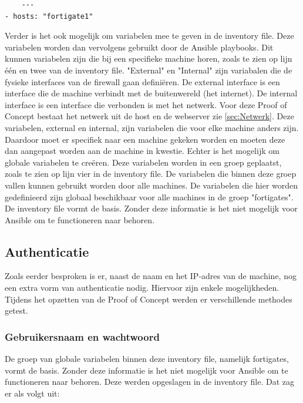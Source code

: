 \begin{lstlisting}
    ---
- hosts: "fortigate1"

\end{lstlisting}
Verder is het ook mogelijk om variabelen mee te geven in de inventory file. Deze variabelen worden dan vervolgens gebruikt door de Ansible playbooks. Dit kunnen variabelen zijn die bij een specifieke machine horen, zoals te zien op lijn één en twee van de inventory file. "External" en "Internal" zijn variabalen die de fysieke interfaces van de firewall gaan definiëren. De external interface is een interface die de machine verbindt met de buitenwereld (het internet). De internal interface is een interface die verbonden is met het netwerk. Voor deze Proof of Concept bestaat het netwerk uit de host en de webserver zie \ref{sec:Netwerk}. Deze variabelen, external en internal, zijn variabelen die voor elke machine anders zijn. Daardoor moet er specifiek naar een machine gekeken worden en moeten deze dan aangepast worden aan de machine in kwestie.  Echter is het mogelijk om globale variabelen te creëren. Deze variabelen worden in een groep geplaatst, zoals te zien op lijn vier in de inventory file. De variabelen die binnen deze groep vallen kunnen gebruikt worden door alle machines. De variabelen die hier worden gedefinieerd zijn globaal beschikbaar voor alle machines in de groep "fortigates". De inventory file vormt de basis. Zonder deze informatie is het niet mogelijk voor Ansible om te functioneren naar behoren.
\subsection{Authenticatie}
Zoals eerder besproken is er, naast de naam en het IP-adres van de machine, nog een extra vorm van authenticatie nodig. Hiervoor zijn enkele mogelijkheden. Tijdens het opzetten van de Proof of Concept werden er verschillende methodes getest. 
\subsubsection{Gebruikersnaam en wachtwoord}
De groep van globale variabelen binnen deze inventory file, namelijk fortigates, vormt de basis. Zonder deze informatie is het niet mogelijk voor Ansible om te functioneren naar behoren. Deze werden opgeslagen in de inventory file. 
Dat zag er als volgt uit: 

